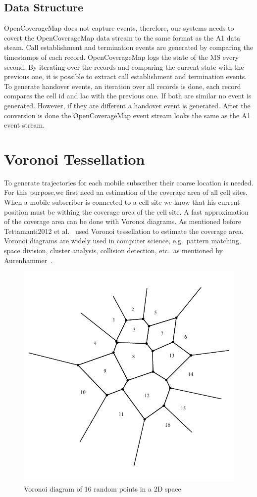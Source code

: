 \documentclass[master,english]{hgbthesis}
\begin{document}
\subsection{Data Structure}
OpenCoverageMap does not capture events, therefore, our systems needs to covert the OpenCoverageMap data stream to the same format as the A1 data steam. Call establishment and termination events are generated by comparing the timestamps of each record. OpenCoverageMap logs the state of the MS every second. By iterating over the records and comparing the current state with the previous one, it is possible to extract call establishment and termination events. To generate handover events, an iteration over all records is done, each record compares the cell id and lac with the previous one. If both are similar no event is generated. However, if they are different a handover event is generated. After the conversion is done the OpenCoverageMap event stream looks the same as the A1 event stream.  
\section{Voronoi Tessellation}
\label{sec:voronoites}
To generate trajectories for each mobile subscriber their coarse location is needed.
For this purpose,we first need an estimation of the coverage area of all cell sites. When a mobile subscriber is connected to a cell site we know that his current position must be withing the coverage area of the cell site. A fast approximation of the coverage area can be done with Voronoi diagrams.
As mentioned before Tettamanti2012 et al.\ \cite{Tettamanti2012} used Voronoi tessellation to estimate the coverage area.
Voronoi diagrams are widely used in computer science, e.g.\ pattern matching, space division, cluster analysis, collision detection, etc.\ as mentioned by Aurenhammer~\cite{Aurenhammer1991}. 
\begin{figure}
	\centering
	\includegraphics[width=0.7\linewidth]{./images/voronoi2}
	\caption{Voronoi diagram of 16 random points in a 2D space}
	\label{fig:voronoi2}
\end{figure}
\end{document}

